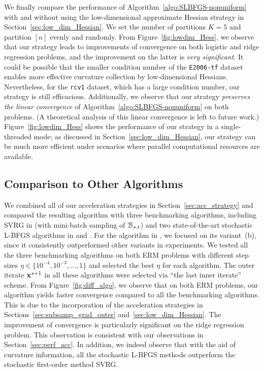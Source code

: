 \documentclass[10pt,twocolumn,journal]{IEEEtran}
\begin{document}
We finally compare the performance of Algorithm~\ref{algo:SLBFGS-nonuniform} with and without using the low-dimensional approximate Hessian strategy in Section~\ref{sec:low_dim_Hessian}. We set the number of partitions $K=5$ and partition $[n]$ evenly and randomly. From Figure~\ref{fig:lowdim_Hess}, we observe that our strategy leads to improvements of convergence on both logistic and ridge regression problems, and the improvement on the latter is {\em very significant}.  It could be possible that the smaller condition number of the {\tt E2006-tf} dataset enables more effective curvature collection by low-dimensional Hessians. Nevertheless, for the {\tt rcv1} dataset, which has a large condition number, our strategy is still efficacious. 
Additionally, we observe that our strategy {\em preserves {the} linear convergence} of Algorithm~\ref{algo:SLBFGS-nonuniform} on both problems. (A theoretical analysis of this linear convergence is left to future work.) 
Figure~\ref{fig:lowdim_Hess} shows the performance of our strategy in a single-threaded mode; as discussed in Section~\ref{sec:low_dim_Hessian}, our strategy can be much more efficient under scenarios where parallel computational resources are available. 




\subsection{Comparison to Other Algorithms}\label{sec:comp_other_algo}
We combined all of our acceleration strategies in Section~\ref{sec:acc_strategy} and compared the resulting algorithm with three benchmarking algorithms, including SVRG in \cite{Johnson_13} (with mini-batch sampling of $\mathcal{B}_{s,t}$) and two state-of-the-art stochastic L-BFGS algorithms in \cite{Moritz_16} and \cite{Gower_16}. For the algorithm in \cite{Gower_16}, we focused on its variant~(b), since it consistently outperformed other variants in experiments. 
We tested all the three benchmarking algorithms on both ERM problems with different step sizes $\eta\in\{10^{-4},10^{-3},\ldots,1\}$ and selected the best $\eta$ for each algorithm. The outer iterate $\mathbf{x}^{s+1}$ in all these algorithms were selected via ``the last inner iterate'' scheme. 
From Figure~\ref{fig:diff_algo}, we observe that on both ERM problems, our algorithm yields faster convergence compared to all the benchmarking algorithms. 
This is due to the incorporation of the acceleration strategies in Sections~\ref{sec:subsamp_grad_outer} and~\ref{sec:low_dim_Hessian}. 
The improvement of convergence is particularly significant on the ridge regression problem. This observation is consistent with our observations in Section~\ref{sec:perf_acc}. 
In addition, we indeed observe that with the aid of curvature information, all the stochastic L-BFGS methods outperform the stochastic first-order method SVRG. 
\end{document}
